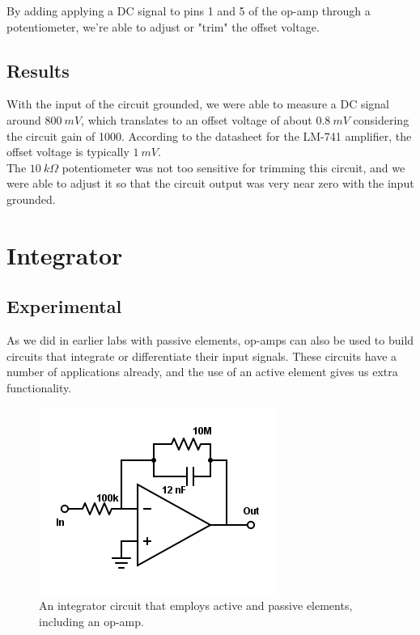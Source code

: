 \documentclass[11pt]{article}
\begin{document}
By adding applying a DC signal to pins 1 and 5 of the op-amp through a potentiometer, we're able to adjust or "trim" the offset voltage. \\


\subsection{Results}

With the input of the circuit grounded, we were able to measure a DC signal around $800\ mV$, which translates to an offset voltage of about $0.8\ mV$ considering the circuit gain of 1000. According to the datasheet for the LM-741 amplifier, the offset voltage is typically $1\ mV$. \\

The $10\ k \Omega$ potentiometer was not too sensitive for trimming this circuit, and we were able to adjust it so that the circuit output was very near zero with the input grounded.\\


\section{Integrator}
\subsection{Experimental}

As we did in earlier labs with passive elements, op-amps can also be used to build circuits that integrate or differentiate their input signals. These circuits have a number of applications already, and the use of an active element gives us extra functionality.\\

\begin{figure}[H]
    \centering
    \includegraphics[scale=0.5]{Diagrams/c-c.png}
    \caption{An integrator circuit that employs active and passive elements, including an op-amp.}
    \label{circuit:c}
\end{figure}
\end{document}
